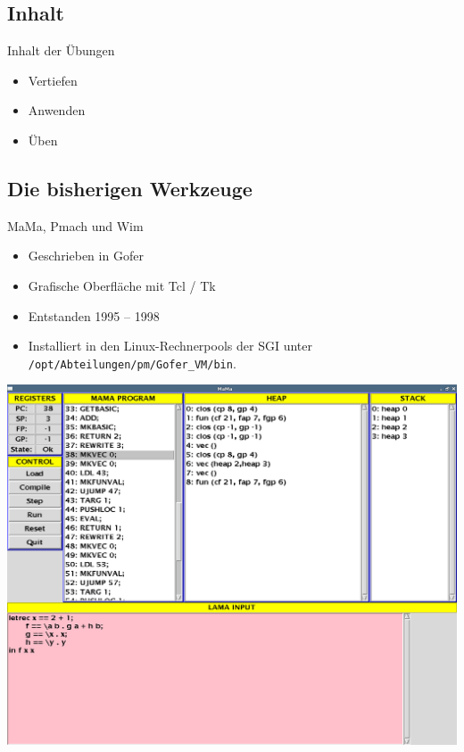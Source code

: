 \documentclass{beamer}
\begin{document}
\subsection*{Inhalt}
\begin{frame}{Inhalt der Übungen}
	\begin{itemize}
	\item Vertiefen
	\item Anwenden
	\item Üben
	\end{itemize}
	
\end{frame}

\subsection*{Die bisherigen Werkzeuge}
\begin{frame}{MaMa, Pmach und Wim}
	\begin{itemize}
	\item Geschrieben in Gofer
	\item Grafische Oberfläche mit Tcl / Tk
	\item Entstanden 1995 -- 1998
	\item Installiert in den Linux-Rechnerpools der SGI unter 
	\texttt{/opt/Abteilungen/pm/Gofer\_VM/bin}.
	\end{itemize}
\end{frame}

\begin{frame}[plain]
	\centering
	\includegraphics[width=\textwidth]{screenshot_old_mama.png}
\end{frame}
\end{document}
